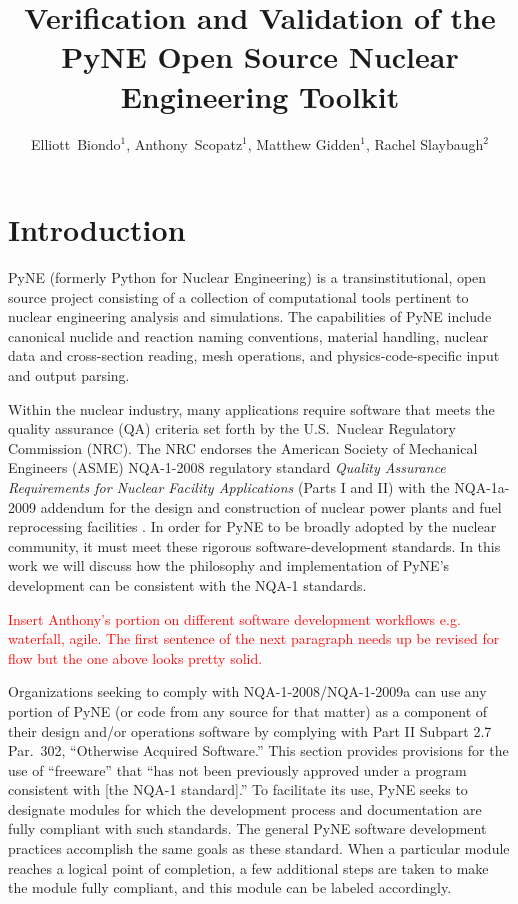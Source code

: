 \documentclass{anstrans}
\title{Verification and Validation of the PyNE Open Source Nuclear Engineering Toolkit}
\author{Elliott~Biondo$^{1}$, Anthony~Scopatz$^{1}$, Matthew Gidden$^{1}$, Rachel Slaybaugh$^{2}$}
\institute{
\and $^{1}$ The University of Wisconsin-Madison, 1500 Engineering Drive, Madison, WI 53706\\
\and $^{2}$ The University of California, Berkeley, 2521 Hearst Ave, Berkeley, CA 94709 \\
}
\begin{document}
\section{Introduction}

PyNE \cite{scopatz_pyne} (formerly Python for Nuclear Engineering) is a
transinstitutional, open source project consisting of a collection of
computational tools pertinent to nuclear engineering analysis and simulations.
The capabilities of PyNE include canonical nuclide and reaction naming
conventions, material handling, nuclear data and cross-section reading, mesh
operations, and physics-code-specific input and output parsing. %

Within the nuclear industry, many applications require software that meets
the quality assurance (QA) criteria set forth by the U.S.\ Nuclear Regulatory
Commission (NRC). The NRC endorses the American Society of Mechanical Engineers
(ASME) NQA-1-2008 regulatory standard \emph{Quality Assurance Requirements for
Nuclear Facility Applications} (Parts I and II) \cite{nrc} with the NQA-1a-2009
addendum \cite{add} for the design and construction of nuclear power plants and
fuel reprocessing facilities \cite{nrc}. 
In order for PyNE to be broadly adopted by the nuclear community, it must meet these rigorous software-development standards.
In this work we will discuss how the philosophy and implementation of PyNE's development can be consistent with the NQA-1 standards.

\textcolor{red}{Insert Anthony's portion on different software development
workflows e.g. waterfall, agile. The first sentence of the next paragraph needs
up be revised for flow but the one above looks pretty solid.}

Organizations seeking to comply with NQA-1-2008/NQA-1-2009a can use any
portion of PyNE (or code from any source for that matter) as a component of
their design and/or operations software by complying with Part II Subpart 2.7
Par.\ 302, ``Otherwise Acquired Software.'' This section provides provisions for the
use of ``freeware'' that ``has not been previously approved under a
program consistent with [the NQA-1 standard].'' To facilitate its use, PyNE seeks to
designate modules for which the development process and documentation are
fully compliant with such standards. The general PyNE software
development practices accomplish the same goals as these standard. When a particular
module reaches a logical point of completion, a few additional steps are
taken to make the module fully compliant, and this module can be labeled accordingly.
\end{document}
